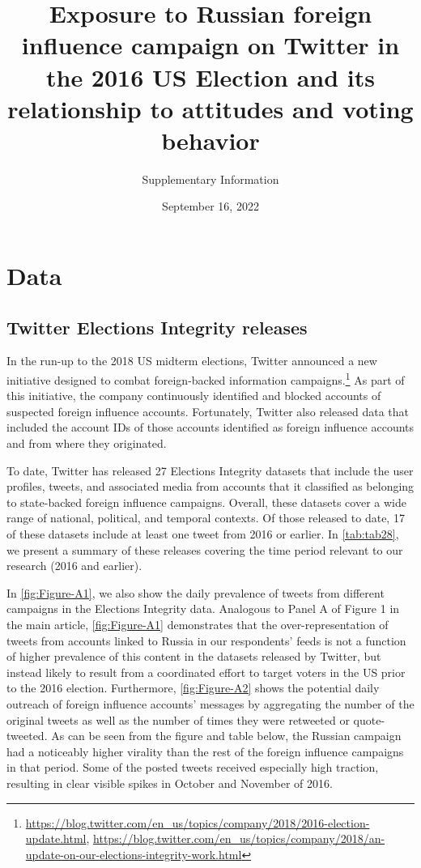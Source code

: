 \documentclass[
  12pt,
]{article}
\title{\Large \textbf{Exposure to Russian foreign influence campaign on Twitter in the 2016 US Election and its relationship to attitudes and voting behavior}\vspace{2mm}}
\subtitle{\Large Supplementary Information}
\author{}
\date{\vspace{-2.5em}September 16, 2022}
\begin{document}
\maketitle

{
\hypersetup{linkcolor=}
\setcounter{tocdepth}{2}
\tableofcontents
}
\clearpage

\hypertarget{data}{%
\section{Data}\label{data}}

\hypertarget{twitter-elections-integrity-releases}{%
\subsection{Twitter Elections Integrity releases}\label{twitter-elections-integrity-releases}}

In the run-up to the 2018 US midterm elections, Twitter announced a new initiative designed to combat foreign-backed information campaigns.\footnote{\url{https://blog.twitter.com/en_us/topics/company/2018/2016-election-update.html}, \url{https://blog.twitter.com/en_us/topics/company/2018/an-update-on-our-elections-integrity-work.html}} As part of this initiative, the company continuously identified and blocked accounts of suspected foreign influence accounts. Fortunately, Twitter also released data that included the account IDs of those accounts identified as foreign influence accounts and from where they originated.

To date, Twitter has released 27 Elections Integrity datasets that include the user profiles, tweets, and associated media from accounts that it classified as belonging to state-backed foreign influence campaigns. Overall, these datasets cover a wide range of national, political, and temporal contexts. Of those released to date, 17 of these datasets include at least one tweet from 2016 or earlier. In \autoref{tab:tab28}, we present a summary of these releases covering the time period relevant to our research (2016 and earlier).

In \autoref{fig:Figure-A1}, we also show the daily prevalence of tweets from different campaigns in the Elections Integrity data. Analogous to Panel A of Figure 1 in the main article, \autoref{fig:Figure-A1} demonstrates that the over-representation of tweets from accounts linked to Russia in our respondents' feeds is not a function of higher prevalence of this content in the datasets released by Twitter, but instead likely to result from a coordinated effort to target voters in the US prior to the 2016 election. Furthermore, \autoref{fig:Figure-A2} shows the potential daily outreach of foreign influence accounts' messages by aggregating the number of the original tweets as well as the number of times they were retweeted or quote-tweeted. As can be seen from the figure and table below, the Russian campaign had a noticeably higher virality than the rest of the foreign influence campaigns in that period. Some of the posted tweets received especially high traction, resulting in clear visible spikes in October and November of 2016.
\end{document}
